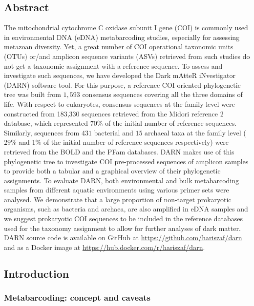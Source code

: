    \subsection{Abstract}
   The mitochondrial cytochrome C oxidase subunit I gene (COI) is commonly used in environmental DNA (eDNA) metabarcoding studies, especially for assessing metazoan diversity. 
   Yet, a great number of COI operational taxonomic units (OTUs) or/and amplicon sequence variants (ASVs) retrieved from such studies do not get a taxonomic assignment with a reference sequence. 
   To assess and investigate such sequences, we have developed the Dark mAtteR iNvestigator (DARN) software tool. For this purpose, a reference COI-oriented phylogenetic tree was built from $1,593$ consensus sequences covering all the three domains of life. 
   With respect to eukaryotes, consensus sequences at the family level were constructed from 183,330 sequences retrieved from the Midori reference 2 database, which represented $70\%$ of the initial number of reference sequences. 
   Similarly, sequences from $431$ bacterial and $15$ archaeal taxa at the family level ($29\%$ and $1\%$ of the initial number of reference sequences respectively) were retrieved from the BOLD and the PFam databases. 
   DARN makes use of this phylogenetic tree to investigate COI pre-processed sequences of amplicon samples to provide both a tabular and a graphical overview of their phylogenetic assignments. 
   To evaluate DARN, both environmental and bulk metabarcoding samples from different aquatic environments using various primer sets were analysed. 
   We demonstrate that a large proportion of non-target prokaryotic organisms, such as bacteria and archaea, are also amplified in eDNA samples and we suggest prokaryotic COI sequences to be included in the reference databases used for the taxonomy assignment to allow for further analyses of dark matter. 
   DARN source code is available on GitHub at \href{https://github.com/hariszaf/darn}{https://github.com/hariszaf/darn} and as a Docker image at \href{https://hub.docker.com/r/hariszaf/darn}{https://hub.docker.com/r/hariszaf/darn}.

   \subsection{Introduction}
   \label{sec:darn-intro}

   \subsubsection*{Metabarcoding: concept and caveats}
   \label{subsec:darn-intro-metabar}

